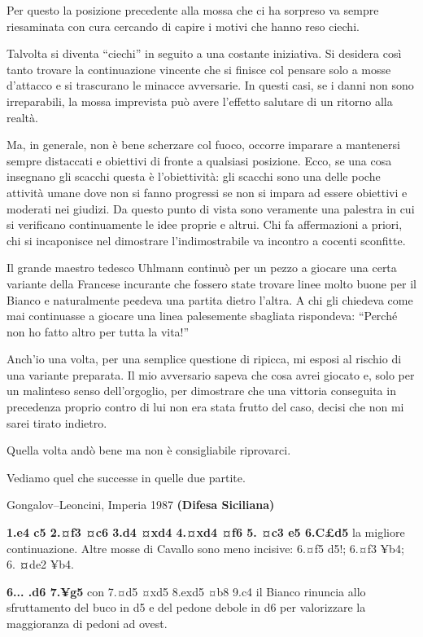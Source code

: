\documentclass[
]{article}
\begin{document}
Per questo la posizione precedente alla mossa che ci ha sorpreso va
sempre riesaminata con cura cercando di capire i motivi che hanno reso
ciechi.

Talvolta si diventa ``ciechi'' in seguito a una costante iniziativa. Si
desidera così tanto trovare la continuazione vincente che si finisce col
pensare solo a mosse d'attacco e si trascurano le minacce avversarie. In
questi casi, se i danni non sono irreparabili, la mossa imprevista può
avere l'effetto salutare di un ritorno alla realtà.

Ma, in generale, non è bene scherzare col fuoco, occorre imparare a
mantenersi sempre distaccati e obiettivi di fronte a qualsiasi
posizione. Ecco, se una cosa insegnano gli scacchi questa è
l'obiettività: gli scacchi sono una delle poche attività umane dove non
si fanno progressi se non si impara ad essere obiettivi e moderati nei
giudizi. Da questo punto di vista sono veramente una palestra in cui si
verificano continuamente le idee proprie e altrui. Chi fa affermazioni a
priori, chi si incaponisce nel dimostrare l'indimostrabile va incontro a
cocenti sconfitte.

Il grande maestro tedesco Uhlmann continuò per un pezzo a giocare una
certa variante della Francese incurante che fossero state trovare linee
molto buone per il Bianco e naturalmente pe¢deva una partita dietro
l'altra. A chi gli chiedeva come mai continuasse a giocare una linea
palesemente sbagliata rispondeva: ``Perché non ho fatto altro per tutta
la vita!''

Anch'io una volta, per una semplice questione di ripicca, mi esposi al
rischio di una variante preparata. Il mio avversario sapeva che cosa
avrei giocato e, solo per un malinteso senso dell'orgoglio, per
dimostrare che una vittoria conseguita in precedenza proprio contro di
lui non era stata frutto del caso, decisi che non mi sarei tirato
indietro.

Quella volta andò bene ma non è consigliabile riprovarci.

Vediamo quel che successe in quelle due partite.

Gongalov--Leoncini, Imperia 1987 \textbf{(Difesa Siciliana)}

\textbf{1.e4 c5 2.¤f3 ¤c6 3.d4 ¤xd4 4.¤xd4 ¤f6 5. ¤c3 e5 6.C£d5} la
migliore continuazione. Altre mosse di Cavallo sono meno incisive: 6.¤f5
d5!; 6.¤f3 ¥b4; 6. \textbf{¤}de2 ¥b4.

\textbf{6... .d6 7.¥g5} con 7.¤d5 ¤xd5 8.exd5 ¤b8 9.c4 il Bianco
rinuncia allo sfruttamento del buco in d5 e del pedone debole in d6 per
valorizzare la maggioranza di pedoni ad ovest.
\end{document}

